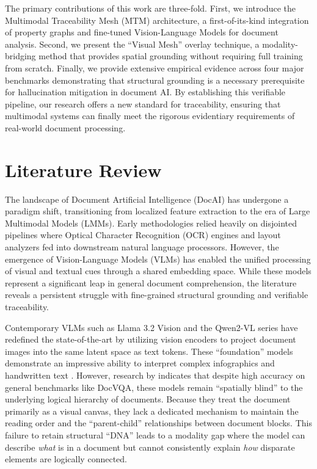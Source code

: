 \documentclass[11pt]{article}
\begin{document}
The primary contributions of this work are three-fold. First, we introduce the Multimodal Traceability Mesh (MTM) architecture, a first-of-its-kind integration of property graphs and fine-tuned Vision-Language Models for document analysis. Second, we present the ``Visual Mesh'' overlay technique, a modality-bridging method that provides spatial grounding without requiring full training from scratch. Finally, we provide extensive empirical evidence across four major benchmarks demonstrating that structural grounding is a necessary prerequisite for hallucination mitigation in document AI. By establishing this verifiable pipeline, our research offers a new standard for traceability, ensuring that multimodal systems can finally meet the rigorous evidentiary requirements of real-world document processing.

\section{Literature Review}
The landscape of Document Artificial Intelligence (DocAI) has undergone a paradigm shift, transitioning from localized feature extraction to the era of Large Multimodal Models (LMMs). Early methodologies relied heavily on disjointed pipelines where Optical Character Recognition (OCR) engines and layout analyzers fed into downstream natural language processors. However, the emergence of Vision-Language Models (VLMs) has enabled the unified processing of visual and textual cues through a shared embedding space. While these models represent a significant leap in general document comprehension, the literature reveals a persistent struggle with fine-grained structural grounding and verifiable traceability. 

Contemporary VLMs such as Llama 3.2 Vision and the Qwen2-VL series have redefined the state-of-the-art by utilizing vision encoders to project document images into the same latent space as text tokens. These ``foundation'' models demonstrate an impressive ability to interpret complex infographics and handwritten text \citep{Lee2024}. However, research by \citet{Fabbri2024} indicates that despite high accuracy on general benchmarks like DocVQA, these models remain ``spatially blind'' to the underlying logical hierarchy of documents. Because they treat the document primarily as a visual canvas, they lack a dedicated mechanism to maintain the reading order and the ``parent-child'' relationships between document blocks. This failure to retain structural ``DNA'' leads to a modality gap where the model can describe \textit{what} is in a document but cannot consistently explain \textit{how} disparate elements are logically connected.
\end{document}
